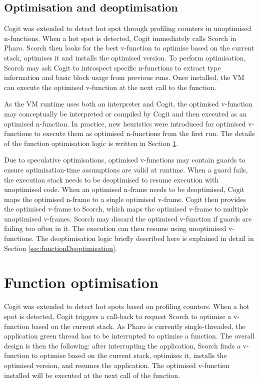 \documentclass[a4paper,12pt,twoside]{../includes/ThesisStyle}
\begin{document}
\subsection{Optimisation and deoptimisation}
\label{sec:further}

Cogit was extended to detect hot spot through profiling counters in unoptimised n-functions. When a hot spot is detected, Cogit immediately calls Scorch in Pharo. Scorch then looks for the best v-function to optimise based on the current stack, optimises it and installs the optimised version. To perform optimisation, Scorch may ask Cogit to introspect specific n-functions to extract type information and basic block usage from previous runs. Once installed, the VM can execute the optimised v-function at the next call to the function. 

As the VM runtime uses both an interpreter and Cogit, the optimised v-function may conceptually be interpreted or compiled by Cogit and then executed as an optimised n-function. In practice, new heuristics were introduced for optimised v-functions to execute them as optimised n-functions from the first run. The details of the function optimisation logic is written in Section \ref{sec:functionOptimisation}.

Due to speculative optimisations, optimised v-functions may contain guards to ensure optimisation-time assumptions are valid at runtime. When a guard fails, the execution stack needs to be deoptimised to resume execution with unoptimised code. When an optimised n-frame needs to be deoptimised, Cogit maps the optimised n-frame to a single optimised v-frame. Cogit then provides the optimised v-frame to Scorch, which maps the optimised v-frame to multiple unoptimised v-frames. Scorch may discard the optimised v-function if guards are failing too often in it. The execution can then resume using unoptimised v-functions. The deoptimisation logic briefly described here is explained in detail in Section \ref{sec:functionDeoptimisation}.


\section{Function optimisation}
\label{sec:functionOptimisation}

Cogit was extended to detect hot spots based on profiling counters. When a hot spot is detected, Cogit triggers a call-back to request Scorch to optimise a v-function based on the current stack. As Pharo is currently single-threaded, the application green thread has to be interrupted to optimise a function. The overall design is then the following: after interrupting the application, Scorch finds a v-function to optimise based on the current stack, optimises it, installs the optimised version, and resumes the application. The optimised v-function installed will be executed at the next call of the function.
\end{document}
